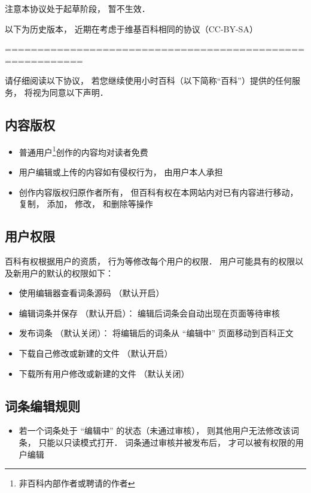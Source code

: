 
注意本协议处于起草阶段， 暂不生效．

以下为历史版本， 近期在考虑于维基百科相同的协议（CC-BY-SA）

==========================================================

请仔细阅读以下协议， 若您继续使用小时百科（以下简称“百科”）提供的任何服务， 将视为同意以下声明．

\subsection{内容版权}
\begin{itemize}
\item 普通用户\footnote{非百科内部作者或聘请的作者}创作的内容均对读者免费
\item 用户编辑或上传的内容如有侵权行为， 由用户本人承担
\item 创作内容版权归原作者所有， 但百科有权在本网站内对已有内容进行移动， 复制， 添加， 修改， 和删除等操作
\end{itemize}

\subsection{用户权限}
百科有权根据用户的资质， 行为等修改每个用户的权限． 用户可能具有的权限以及新用户的默认的权限如下：
\begin{itemize}
\item 使用编辑器查看词条源码 （默认开启）
\item 编辑词条并保存 （默认开启）： 编辑后词条会自动出现在页面等待审核
\item 发布词条 （默认关闭）： 将编辑后的词条从 “编辑中” 页面移动到百科正文
\item 下载自己修改或新建的文件 （默认开启）
\item 下载所有用户修改或新建的文件 （默认关闭）
\end{itemize}

\subsection{词条编辑规则}
\begin{itemize}
\item 若一个词条处于 “编辑中” 的状态（未通过审核）， 则其他用户无法修改该词条， 只能以只读模式打开． 词条通过审核并被发布后， 才可以被有权限的用户编辑
\end{itemize}
